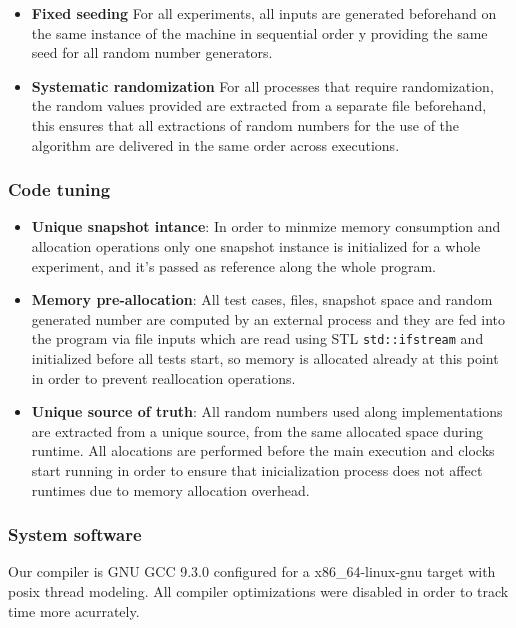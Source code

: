 \begin{itemize}
    \item{\textbf{Fixed seeding}
    For all experiments, all inputs are generated beforehand on the same instance of the machine in sequential order y providing the same seed for all random number generators.}
    
    \item{\textbf{Systematic randomization}
    For all processes that require randomization, the random values provided are extracted from a separate file beforehand, this ensures that all extractions of random numbers for the use of the algorithm are delivered in the same order across executions.}
\end{itemize}

\subsubsection{Code tuning}
\begin{itemize}
    \item{\textbf{Unique snapshot intance}: 
    In order to minmize memory consumption and allocation operations only one snapshot instance is initialized for a whole experiment, and it's passed as reference along the whole program.}
    \item{\textbf{Memory pre-allocation}: 
    All test cases, files, snapshot space and random generated number are computed by an external process and they are fed into the program via file inputs which are read using STL \texttt{std::ifstream} and initialized before all tests start, so memory is allocated already at this point in order to prevent reallocation operations.}
    \item{\textbf{Unique source of truth}:
    All random numbers used along implementations are extracted from a unique source, from the same allocated space during runtime. All alocations are performed before the main execution and clocks start running in order to ensure that inicialization process does not affect runtimes due to memory allocation overhead.}
\end{itemize}

\subsubsection{System software}
Our compiler is GNU GCC 9.3.0 configured for a x86\_64-linux-gnu target with posix thread modeling. All compiler optimizations were disabled in order to track time more acurrately.
